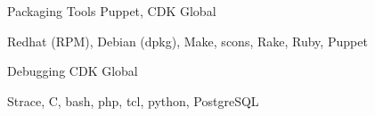 

\begin{cventries}

  \cventry
    {Packaging Tools} %
    {Puppet, CDK Global} %
    {} %
    {} %
    {
        \begin{cvitems}
            \item{Redhat (RPM), Debian (dpkg), Make, scons, Rake, Ruby, Puppet}
        \end{cvitems}
    }


  \cventry
    {Debugging} %
    {CDK Global} %
    {} %
    {} %
    {
        \begin{cvitems}
            \item{Strace, C, bash, php, tcl, python, PostgreSQL}
        \end{cvitems}
    }
\end{cventries}

